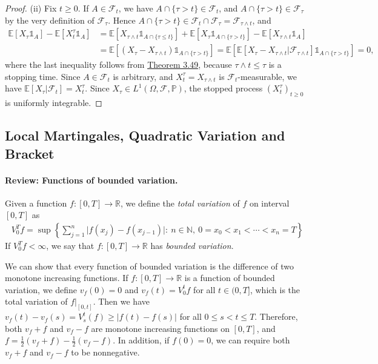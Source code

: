 \documentclass{article}
\numberwithin{equation}{section}
\newcommand{\E}{\mathbb{E}}
\renewcommand{\P}{\mathbb{P}}
\theoremstyle{plain}
\theoremstyle{definition}
\begin{document}
\begin{proof}
(ii) Fix $t\geq 0$. If $A\in\mathscr{F}_t$, we have $A\cap\{\tau>t\}\in\mathscr{F}_t$, and $A\cap\{\tau>t\}\in\mathscr{F}_\tau$ by the very definition of $\mathscr{F}_\tau$. Hence $A\cap\{\tau>t\}\in\mathscr{F}_t\cap\mathscr{F}_\tau=\mathscr{F}_{\tau\wedge t}$, and
\begin{align*}
	\E\left[X_\tau\mathds{1}_A\right] - \E\left[X_t^\tau\mathds{1}_A\right] &= \E\left[X_{\tau\wedge t}\mathds{1}_{A\cap\{\tau\leq t\}}\right] + \E\left[X_\tau\mathds{1}_{A\cap\{\tau>t\}}\right] - \E\left[X_{\tau\wedge t}\mathds{1}_A\right]\\
	&=\E\left[(X_\tau-X_{\tau\wedge t})\mathds{1}_{A\cap\{\tau>t\}}\right]=\E\left[\E\left[X_\tau-X_{\tau\wedge t}|\mathscr{F}_{\tau\wedge t}\right]\mathds{1}_{A\cap\{\tau>t\}}\right] = 0,
\end{align*}
where the last inequality follows from \hyperref[thm:3.49]{Theorem 3.49}, because $\tau\wedge t\leq\tau$ is a stopping time. Since $A\in\mathscr{F}_t$ is arbitrary, and $X_t^\tau=X_{\tau\wedge t}$ is $\mathscr{F}_t$-measurable, we have $\E[X_\tau|\mathscr{F}_t]=X_t^\tau$. Since $X_\tau\in L^1(\Omega,\mathscr{F},\P)$, the stopped process $(X_t^\tau)_{t\geq 0}$ is uniformly integrable.
\end{proof}

\subsection{Local Martingales, Quadratic Variation and Bracket}
\paragraph{Review: Functions of bounded variation.} Given a function $f:[0,T]\to\mathbb{R}$, we define the \textit{total variation} of $f$ on interval $[0,T]$ as
\begin{align*}
	V_0^T f = \sup\left\{\sum_{j=1}^n\vert f(x_j)-f(x_{j-1})\vert:\ n\in\mathbb{N},\ 0=x_0<x_1<\cdots<x_n=T\right\}
\end{align*}
If $V_0^T f < \infty$, we say that $f:[0,T]\to\mathbb{R}$ has \textit{bounded variation}.

We can show that every function of bounded variation is the difference of two monotone increasing functions. If $f:[0,T]\to\mathbb{R}$ is a function of bounded variation, we define $v_f(0)=0$ and $v_f(t)=V_0^t f$ for all $t\in(0,T]$, which is the total variation of $f|_{[0,t]}$. Then we have $v_f(t)-v_f(s)=V_s^t(f)\geq\vert f(t)-f(s)\vert$ for all $0\leq s<t\leq T$. Therefore, both $v_f+f$ and $v_f-f$ are monotone increasing functions on $[0,T]$, and $f=\frac{1}{2}(v_f+f)-\frac{1}{2}(v_f-f)$. In addition, if $f(0)=0$, we can require both $v_f+f$ and $v_f-f$ to be nonnegative.
\end{document}

